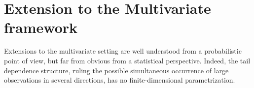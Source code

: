 
\section{Extension to the Multivariate framework}
\label{back:sec:MEVT} 

Extensions to the multivariate setting are well understood
from a probabilistic point of view, but far from obvious from a
statistical perspective. Indeed, the tail dependence structure, ruling the possible simultaneous occurrence of large observations in several directions, has no finite-dimensional parametrization.

